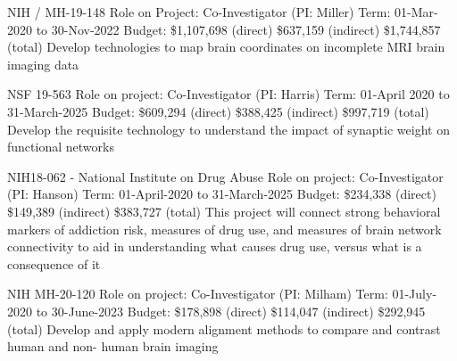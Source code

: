 \documentclass[10pt,colorlinks=true,urlcolor=blue]{moderncv}
\begin{document}
{\newline NIH / MH-19-148
\newline Role on Project: Co-Investigator (PI: Miller)
\newline Term: 01-Mar-2020 to 30-Nov-2022
\newline Budget: \$1,107,698 (direct) \$637,159 (indirect) \$1,744,857 (total)
\newline Develop technologies to map brain coordinates on incomplete MRI brain imaging data}{}{}{}{}


{\newline NSF 19-563
\newline Role on project: Co-Investigator (PI: Harris)
\newline Term: 01-April 2020 to 31-March-2025
\newline Budget: \$609,294 (direct) \$388,425 (indirect) \$997,719 (total)
\newline Develop the requisite technology to understand the impact of synaptic weight on functional
networks}{}{}{}{}

{\newline NIH18-062 - National Institute on Drug Abuse
\newline Role on project: Co-Investigator (PI: Hanson)
\newline Term: 01-April-2020 to 31-March-2025
\newline Budget: \$234,338 (direct) \$149,389 (indirect) \$383,727 (total)
\newline This project will connect strong behavioral markers of addiction risk, measures of drug use,
and measures of brain network connectivity to aid in understanding what causes drug use,
versus what is a consequence of it}{}{}{}{}

{\newline NIH MH-20-120
\newline Role on project: Co-Investigator (PI: Milham)
\newline Term: 01-July-2020 to 30-June-2023
\newline Budget: \$178,898 (direct) \$114,047 (indirect) \$292,945 (total)
\newline Develop and apply modern alignment methods to compare and contrast human and non-
human brain imaging}{}{}{}{}
\end{document}
